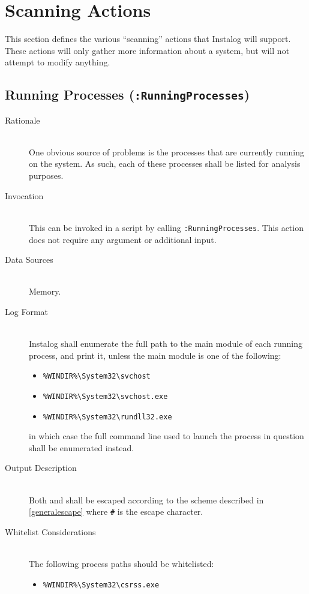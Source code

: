 \section{Scanning Actions} \label{sec:scanning_actions}
This section defines the various ``scanning'' actions that Instalog will
support.  These actions will only gather more information about a system, but
will not attempt to modify anything.

\subsection{Running Processes (\texttt{:RunningProcesses})}
\begin{description}
\item[Rationale] \hfill \\
One obvious source of problems is the processes that are currently running on
the system.  As such, each of these processes shall be listed for analysis
purposes.  
\item[Invocation] \hfill \\
This can be invoked in a script by calling \verb|:RunningProcesses|.  This
action does not require any argument or additional input.
\item[Data Sources] \hfill \\
Memory.
\item[Log Format] \hfill \\
Instalog shall enumerate the full path to the main module of each running
process, and print it, unless the main module is one of the following:
\begin{itemize}
  \item \verb|%WINDIR%\System32\svchost|
  \item \verb|%WINDIR%\System32\svchost.exe|
  \item \verb|%WINDIR%\System32\rundll32.exe|
\end{itemize}
in which case the full command line used to launch the process in question shall
be enumerated instead.
\item[Output Description] \hfill \\
Both  and  shall be escaped according to the scheme
described in \ref{generalescape} where \verb|#| is the escape character.
\item[Whitelist Considerations] \hfill \\
The following process paths should be whitelisted:
\begin{itemize}
  \item \verb|%WINDIR%\System32\csrss.exe|

\end{itemize}
\end{description}
